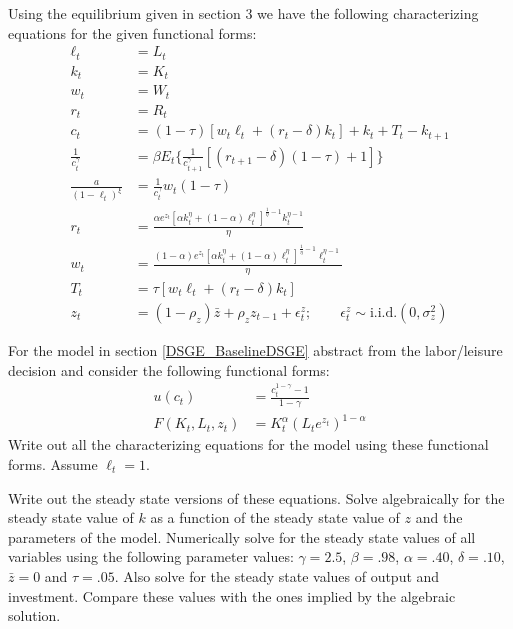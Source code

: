\documentclass[letterpaper,11pt]{article}
\theoremstyle{definition}
\begin{document}
\begin{spacing}{1.5}
	Using the equilibrium given in section 3 we have the following characterizing equations for the given functional forms:
	\begin{align*}
		\ell_t &= L_t \\
		k_t &= K_t \\
		w_t &= W_t \\
		r_t &= R_t \\
		c_t &= (1-\tau)[w_t\ell_t+(r_t-\delta)k_t]+k_t+T_t-k_{t+1} \\
		\frac{1}{c_t^\gamma} &=  \beta E_t \{\frac{1}{c_{t+1}^\gamma}[(r_{t+1}-\delta)(1-\tau)+1]\} \\
		\frac{a}{(1-\ell_t)^\xi} &= \frac{1}{c_t^\gamma} w_t(1-\tau) \\
		r_t&= \frac{\alpha e^{z_t}[\alpha k_t^{\eta}+(1-\alpha)\ell_t^\eta]^{\frac{1}{\eta}-1}k_t^{\eta-1}}{\eta}\\
		w_t&= \frac{(1-\alpha) e^{z_t}[\alpha k_t^{\eta}+(1-\alpha)\ell_t^\eta]^{\frac{1}{\eta}-1}\ell_t^{\eta-1}}{\eta}\\
		T_t &= \tau[w_t\ell_t+(r_t-\delta)k_t] \\
		z_t &= (1-\rho_z)\bar{z}+\rho_zz_{t-1}+\epsilon_t^z; \qquad \epsilon_t^z \sim \text{i.i.d.}(0,\sigma_z^2)
	\end{align*}

	\begin{Exercise} \label{DSGE_HW_NoLeisure}
		For the model in section \ref{DSGE_BaselineDSGE} abstract from the labor/leisure decision and consider the following functional forms:
		\begin{equation}\label{DSGE_HW_NoLeisure_eq01}
		\begin{split}
		u(c_t) & = \frac{c^{1-\gamma}_t -1}{1-\gamma}      \\
		F(K_t,L_t,z_t) & = K^{\alpha}_t (L_te^{z_t})^{1-\alpha}  \nonumber
		\end{split}
		\end{equation}
		Write out all the characterizing equations for the model using these functional forms.  Assume $\ell_t=1$.

		Write out the steady state versions of these equations.  Solve algebraically for the steady state value of $k$ as a function of the steady state value of $z$ and the parameters of the model.  Numerically solve for the steady state values of all variables using the following parameter values: $\gamma = 2.5$, $\beta = .98$, $\alpha = .40$, $\delta = .10$, $\bar z = 0$ and $\tau = .05$.  Also solve for the steady state values of output and investment.  Compare these values with the ones implied by the algebraic solution.
	\end{Exercise}


\end{spacing}
\end{document}

